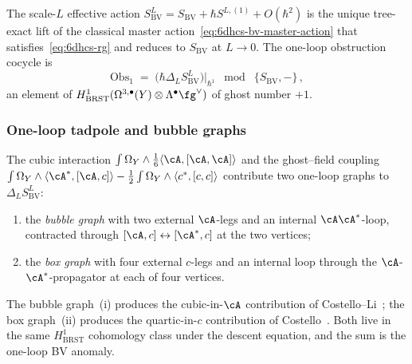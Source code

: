 \begin{definition}
\label{def:6dhcs-bv-laplacian}
The scale-$L$ effective action $S^L_{\mathrm{BV}} = S_{\mathrm{BV}}
+\hbar S^{L,(1)}+O(\hbar^2)$ is the unique tree-exact lift of the
classical master action~\eqref{eq:6dhcs-bv-master-action} that
satisfies~\eqref{eq:6dhcs-rg} and reduces to $S_{\mathrm{BV}}$ at
$L\to 0$. The one-loop obstruction cocycle is
\begin{equation}\label{eq:6dhcs-obs1-def}
 \mathrm{Obs}_1
 \;=\;
 \bigl(\hbar\Delta_L S^L_{\mathrm{BV}}\bigr)\big|_{\hbar^1}
 \;\bmod\; \{S_{\mathrm{BV}},-\}\,,
\end{equation}
an element of $H^1_{\mathrm{BRST}}(\Omega^{3,\bullet}(Y)
\otimes\Lambda^\bullet\fg^\vee)$ of ghost number $+1$.
\end{definition}

\subsubsection{One-loop tadpole and bubble graphs}
\label{subsubsec:6dhcs-tadpole}

The cubic interaction $\int\Omega_Y\wedge\tfrac16\langle\cA,
[\cA,\cA]\rangle$ and the ghost--field coupling
$\int\Omega_Y\wedge\langle\cA^*,[\cA,c]\rangle
-\tfrac12\int\Omega_Y\wedge\langle c^*,[c,c]\rangle$ contribute two
one-loop graphs to $\Delta_L S^L_{\mathrm{BV}}$:
\begin{enumerate}[label=\textup{(\roman*)}]
\item the \emph{bubble graph} with two external $\cA$-legs and an
 internal $\cA\cA^*$-loop, contracted through
 $[\cA,c]\leftrightarrow[\cA^*,c]$ at the two vertices;
\item the \emph{box graph} with four external $c$-legs and an
 internal loop through the $\cA$-$\cA^*$-propagator at each of four
 vertices.
\end{enumerate}
The bubble graph~(i) produces the cubic-in-$\cA$ contribution of
Costello--Li~\cite{CL16}; the box graph~(ii) produces
the quartic-in-$c$ contribution of Costello~\cite{Costello2017M5}.
Both live in the same $H^1_{\mathrm{BRST}}$ cohomology class under
the descent equation, and the sum is the one-loop BV anomaly.

